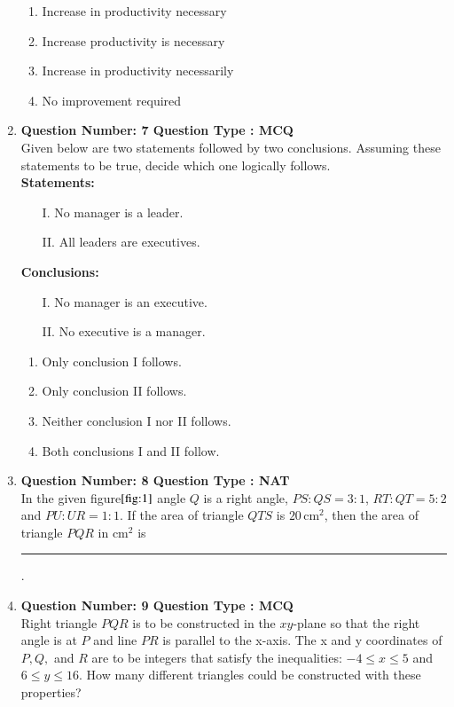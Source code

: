 \documentclass[journal]{IEEEtran}
\numberwithin{equation}{enumi}
\numberwithin{figure}{enumi}
\begin{document}
\begin{enumerate}
\begin{enumerate}
    \item Increase in productivity necessary
    \item Increase productivity is necessary
    \item Increase in productivity necessarily
    \item No improvement required
\end{enumerate}
\bigskip
\item \textbf{Question Number: 7 Question Type : MCQ}\\
Given below are two statements followed by two conclusions. Assuming these statements to be true, decide which one logically follows. \\

\textbf{Statements:}
\begin{enumerate}
    \item[I.] No manager is a leader.
    \item[II.] All leaders are executives.
\end{enumerate}

\textbf{Conclusions:}
\begin{enumerate}
    \item[I.] No manager is an executive.
    \item[II.] No executive is a manager.
\end{enumerate}

\begin{enumerate}
    \item Only conclusion I follows.
    \item Only conclusion II follows.
    \item Neither conclusion I nor II follows.
    \item Both conclusions I and II follow.
\end{enumerate}
\bigskip
\item \textbf{Question Number: 8 Question Type : NAT}\\
In the given figure$\ref{fig:1}$ angle $ Q $ is a right angle, $ PS:QS = 3:1 $, $ RT:QT = 5:2 $ and $ PU:UR = 1:1 $. If the area of triangle $ QTS $ is $ 20 \, \text{cm}^2 $, then the area of triangle $ PQR $ in $ \text{cm}^2 $ is \rule{1cm}{0.15mm}.
\begin{figure}[H]
    \centering
    
    \caption{}
    \label{fig:1}
\end{figure}
\bigskip
\item \textbf{Question Number: 9 Question Type : MCQ}\\
Right triangle $ PQR $ is to be constructed in the $ xy $-plane so that the right angle is at $ P $ and line $ PR $ is parallel to the x-axis. The x and y coordinates of $ P, Q, $ and $ R $ are to be integers that satisfy the inequalities: $ -4 \leq x \leq 5 $ and $ 6 \leq y \leq 16 $. How many different triangles could be constructed with these properties? \\


\end{enumerate}
\end{document}
